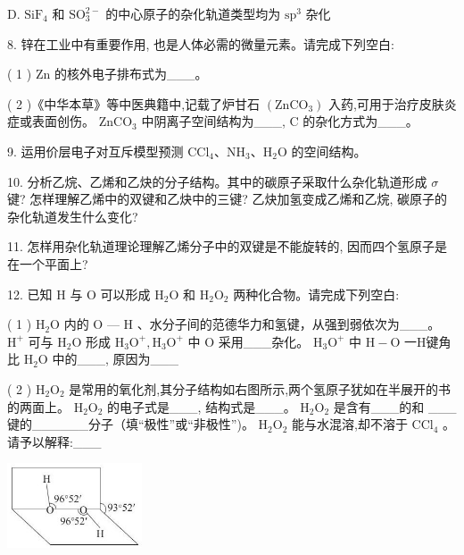 \documentclass[10pt]{article}
\begin{document}
D. \({\mathrm{{SiF}}}_{4}\) 和 \({\mathrm{{SO}}}_{3}^{2 - }\) 的中心原子的杂化轨道类型均为 \({\mathrm{{sp}}}^{3}\) 杂化

8. 锌在工业中有重要作用, 也是人体必需的微量元素。请完成下列空白:

( 1 ) \(\mathrm{{Zn}}\) 的核外电子排布式为\_\_\_。

( 2 )《中华本草》等中医典籍中,记载了炉甘石 \(\left( {\mathrm{{ZnCO}}}_{3}\right)\) 入药,可用于治疗皮肤炎症或表面创伤。 \({\mathrm{{ZnCO}}}_{3}\) 中阴离子空间结构为\_\_\_, \(\mathrm{C}\) 的杂化方式为\_\_\_。

9. 运用价层电子对互斥模型预测 \({\mathrm{{CCl}}}_{4}\text{、}{\mathrm{{NH}}}_{3}\text{、}{\mathrm{H}}_{2}\mathrm{O}\) 的空间结构。

10. 分析乙烷、乙烯和乙炔的分子结构。其中的碳原子采取什么杂化轨道形成 \(\sigma\) 键? 怎样理解乙烯中的双键和乙炔中的三键? 乙炔加氢变成乙烯和乙烷, 碳原子的杂化轨道发生什么变化?

11. 怎样用杂化轨道理论理解乙烯分子中的双键是不能旋转的, 因而四个氢原子是在一个平面上?

12. 已知 \(\mathrm{H}\) 与 \(\mathrm{O}\) 可以形成 \({\mathrm{H}}_{2}\mathrm{O}\) 和 \({\mathrm{H}}_{2}{\mathrm{O}}_{2}\) 两种化合物。请完成下列空白:

( 1 ) \({\mathrm{H}}_{2}\mathrm{O}\) 内的 \(\mathrm{O}\) — \(\mathrm{H}\) 、水分子间的范德华力和氢键，从强到弱依次为\_\_\_。 \({\mathrm{H}}^{ + }\) 可与 \({\mathrm{H}}_{2}\mathrm{O}\) 形成 \({\mathrm{H}}_{3}{\mathrm{O}}^{ + },{\mathrm{H}}_{3}{\mathrm{O}}^{ + }\) 中 \(\mathrm{O}\) 采用\_\_\_杂化。 \({\mathrm{H}}_{3}{\mathrm{O}}^{ + }\) 中 \(\mathrm{H} - \mathrm{O}\) 一H键角比 \({\mathrm{H}}_{2}\mathrm{O}\) 中的\_\_\_, 原因为\_\_\_

( 2 ) \({\mathrm{H}}_{2}{\mathrm{O}}_{2}\) 是常用的氧化剂,其分子结构如右图所示,两个氢原子犹如在半展开的书的两面上。 \({\mathrm{H}}_{2}{\mathrm{O}}_{2}\) 的电子式是\_\_\_, 结构式是\_\_\_。 \({\mathrm{H}}_{2}{\mathrm{O}}_{2}\) 是含有\_\_\_的和 \_\_\_键的\_\_\_\_\_\_分子（填“极性”或“非极性”)。 \({\mathrm{H}}_{2}{\mathrm{O}}_{2}\) 能与水混溶,却不溶于 \({\mathrm{{CCl}}}_{4}\) 。请予以解释:\_\_\_

\begin{center}
\includegraphics[max width=0.3\textwidth]{images/0190e026-5a11-7df7-bd27-54d09026ba7a_69_731187.jpg}
\end{center}
\end{document}
